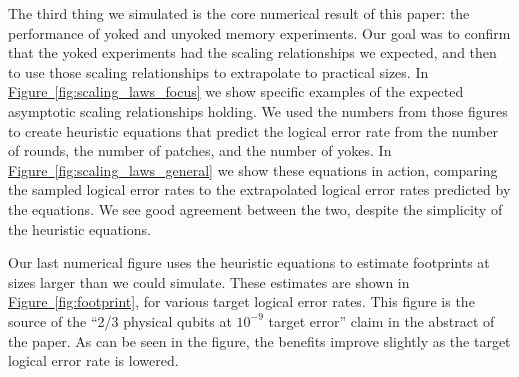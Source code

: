 \documentclass[onecolumn,unpublished,a4paper]{quantumarticle}
\theoremstyle{definition}
\theoremstyle{definition}
\theoremstyle{definition}
\newcommand{\fig}[1]{\hyperref[fig:#1]{Figure~\ref*{fig:#1}}}
\begin{document}
The third thing we simulated is the core numerical result of this paper: the performance of yoked and unyoked memory experiments.
Our goal was to confirm that the yoked experiments had the scaling relationships we expected, and then to use those scaling relationships to extrapolate to practical sizes.
In \fig{scaling_laws_focus} we show specific examples of the expected asymptotic scaling relationships holding.
We used the numbers from those figures to create heuristic equations that predict the logical error rate from the number of rounds, the number of patches, and the number of yokes.
In \fig{scaling_laws_general} we show these equations in action, comparing the sampled logical error rates to the extrapolated logical error rates predicted by the equations.
We see good agreement between the two, despite the simplicity of the heuristic equations.

Our last numerical figure uses the heuristic equations to estimate footprints at sizes larger than we could simulate.
These estimates are shown in \fig{footprint}, for various target logical error rates.
This figure is the source of the ``2/3 physical qubits at $10^{-9}$ target error'' claim in the abstract of the paper.
As can be seen in the figure, the benefits improve slightly as the target logical error rate is lowered.
\end{document}
